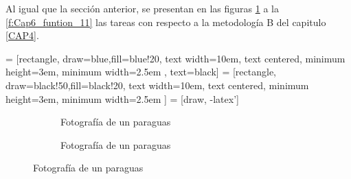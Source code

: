        Al igual que la sección anterior, se presentan en las figuras \ref{f:Cap6_funtion_7} a la \ref{f:Cap6_funtion_11} las tareas con respecto a la  metodología B del capitulo \ref{CAP4}. 
    
            \hspace{1cm}


     = [rectangle, draw=blue,fill=blue!20, text width=10em, text centered, minimum height=3em, minimum width=2.5em , text=black]
     = [rectangle, draw=black!50,fill=black!20, text width=10em, text centered, minimum height=3em, minimum width=2.5em ]
     = [draw, -latex']

    \begin{figure}[h]
        \centering
        \begin{subfigure}
                \centering
                    \caption{Fotografía de un paraguas}
                    \label{f:Cap6_funtion_7}
        \end{subfigure}
        
        \hspace{1cm}

        \begin{subfigure}
                \centering
                    \caption{Fotografía de un paraguas}
                    \label{f:Cap6_funtion_8}
        \end{subfigure}
        

\end{figure}
